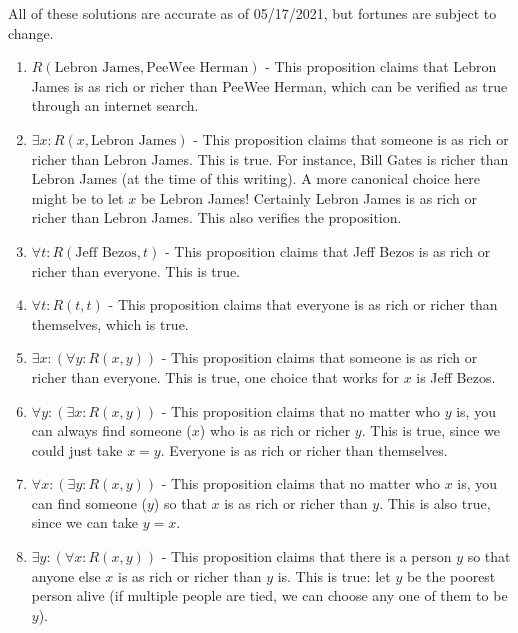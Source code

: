 \begin{solutions}
	
	All of these solutions are accurate as of 05/17/2021, but fortunes are subject to change.
	\begin{enumerate}
		\item $R(\textrm{Lebron James}, \textrm{PeeWee Herman})$ - This proposition claims that Lebron James is as rich or richer than PeeWee Herman, which can be verified as true through an internet search.
		\item $\exists x: R(x,\textrm{Lebron James})$ - This proposition claims that someone is as rich or richer than Lebron James.  This is true.  For instance, Bill Gates is richer than Lebron James (at the time of this writing).  A more canonical choice here might be to let $x$ be Lebron James!  Certainly Lebron James is as rich or richer than Lebron James.  This also verifies the proposition.
		\item $\forall t: R(\textrm{Jeff Bezos}, t )$ - This proposition claims that Jeff Bezos is as rich or richer than everyone.  This is true.
		\item $\forall t: R(t,t)$ -  This proposition claims that everyone is as rich or richer than themselves, which is true.
		\item $\exists x: \left( \forall y : R(x,y)\right)$ - This proposition claims that someone is as rich or richer than everyone.  This is true, one choice that works for $x$ is Jeff Bezos.
		\item $\forall y : \left( \exists x : R(x,y)\right)$  - This proposition claims that no matter who $y$ is, you can always find someone ($x$) who is as rich or richer $y$.  This is true, since we could just take $x = y$.  Everyone is as rich or richer than themselves.
		\item $\forall x : \left( \exists y : R(x,y)\right)$ - This proposition claims that no matter who $x$ is, you can find someone ($y$) so that $x$ is as rich or richer than $y$.  This is also true, since we can take $y = x$.
		\item $\exists y : \left( \forall  x : R(x,y)\right)$ - This proposition claims that there is a person $y$ so that anyone else $x$ is as rich or richer than $y$ is.  This is true:  let $y$ be the poorest person alive (if multiple people are tied, we can choose any one of them to be $y$).
	\end{enumerate}
	\end{solutions}


